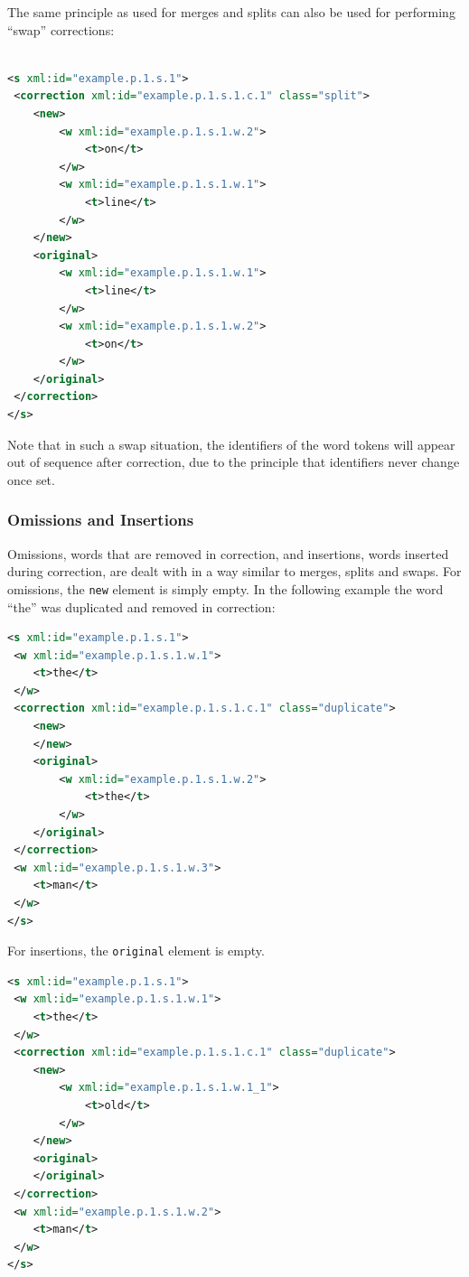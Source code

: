 \documentclass[a4paper,12pt]{report}
\begin{document}
The same principle as used for merges and splits can also be used for performing ``swap'' corrections:

\begin{lstlisting}[language=xml]

<s xml:id="example.p.1.s.1">
 <correction xml:id="example.p.1.s.1.c.1" class="split">
    <new>    
        <w xml:id="example.p.1.s.1.w.2">
            <t>on</t>
        </w>
        <w xml:id="example.p.1.s.1.w.1">
            <t>line</t>
        </w>
    </new>
    <original>
        <w xml:id="example.p.1.s.1.w.1">
            <t>line</t>
        </w>
        <w xml:id="example.p.1.s.1.w.2">
            <t>on</t>
        </w>
    </original>
 </correction>               
</s>
\end{lstlisting}

Note that in such a swap situation, the identifiers of the word tokens will appear out of sequence after correction, due to the principle that identifiers never change once set.


\subsubsection{Omissions and Insertions}

Omissions, words that are removed in correction, and insertions, words inserted during correction, are dealt with in a way similar to merges, splits and swaps. For omissions, the \texttt{new} element is simply empty. In the following example the word ``the'' was duplicated and removed in correction:

\begin{lstlisting}[language=xml]
<s xml:id="example.p.1.s.1">
 <w xml:id="example.p.1.s.1.w.1">
    <t>the</t>
 </w>
 <correction xml:id="example.p.1.s.1.c.1" class="duplicate">
    <new>                        
    </new>
    <original>
        <w xml:id="example.p.1.s.1.w.2">
            <t>the</t>
        </w>
    </original>
 </correction>  
 <w xml:id="example.p.1.s.1.w.3">
    <t>man</t>
 </w>
</s>
\end{lstlisting}

For insertions, the \texttt{original} element is empty. 

\begin{lstlisting}[language=xml]
<s xml:id="example.p.1.s.1">
 <w xml:id="example.p.1.s.1.w.1">
    <t>the</t>
 </w>
 <correction xml:id="example.p.1.s.1.c.1" class="duplicate">
    <new>                            
        <w xml:id="example.p.1.s.1.w.1_1">
            <t>old</t>
        </w>
    </new>
    <original>
    </original>
 </correction>  
 <w xml:id="example.p.1.s.1.w.2">
    <t>man</t>
 </w>
</s>
\end{lstlisting}
\end{document}
